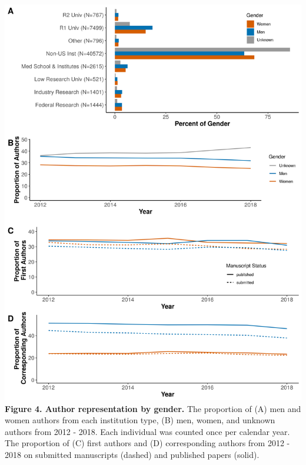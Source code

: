 \documentclass[11pt,]{article}
\begin{document}
\includegraphics{Figure_3.png} \textbf{Figure 4. Author representation
by gender.} The proportion of (A) men and women authors from each
institution type, (B) men, women, and unknown authors from 2012 - 2018.
Each individual was counted once per calendar year. The proportion of
(C) first authors and (D) corresponding authors from 2012 - 2018 on
submitted manuscripts (dashed) and published papers (solid).

\newpage
\end{document}
